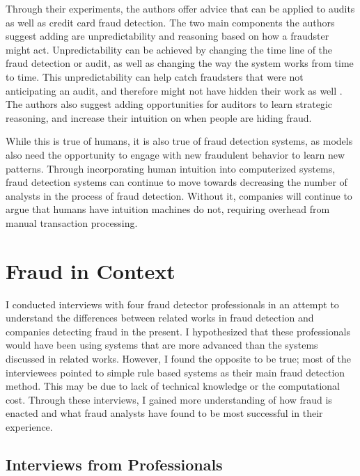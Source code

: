 \documentclass[midd]{thesis}
\begin{document}
Through their experiments, the authors offer advice that can be applied to audits as well as credit card fraud detection. The two main components the authors suggest adding are unpredictability and reasoning based on how a fraudster might act. Unpredictability can be achieved by changing the time line of the fraud detection or audit, as well as changing the way the system works from time to time. This unpredictability can help catch fraudsters that were not anticipating an audit, and therefore might not have hidden their work as well \cite{Wilks2004}. The authors also suggest adding opportunities for auditors to learn strategic reasoning, and increase their intuition on when people are hiding fraud. 

While this is true of humans, it is also true of fraud detection systems, as models also need the opportunity to engage with new fraudulent behavior to learn new patterns. Through incorporating human intuition into computerized systems, fraud detection systems can continue to move towards decreasing the number of analysts in the process of fraud detection. Without it, companies will continue to argue that humans have intuition machines do not, requiring overhead from manual transaction processing. 




\noindent

\pagebreak
\chapter{ Fraud in Context}
\label{sec:context}

I conducted interviews with four fraud detector professionals in an attempt to understand the differences between related works in fraud detection and companies detecting fraud in the present. I hypothesized that these professionals would have been using systems that are more advanced than the systems discussed in related works. However, I found the opposite to be true; most of the interviewees pointed to simple rule based systems as their main fraud detection method. This may be due to lack of technical knowledge or the computational cost. Through these interviews, I gained more understanding of how fraud is enacted and what fraud analysts have found to be most successful in their experience. 

\section{ Interviews from Professionals}
\end{document}
